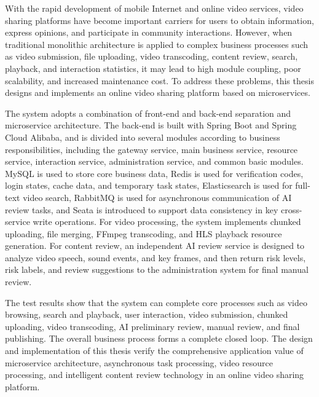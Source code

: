 \begin{abstractEn}
With the rapid development of mobile Internet and online video services, video sharing platforms have become important carriers for users to obtain information, express opinions, and participate in community interactions. However, when traditional monolithic architecture is applied to complex business processes such as video submission, file uploading, video transcoding, content review, search, playback, and interaction statistics, it may lead to high module coupling, poor scalability, and increased maintenance cost. To address these problems, this thesis designs and implements an online video sharing platform based on microservices.

The system adopts a combination of front-end and back-end separation and microservice architecture. The back-end is built with Spring Boot and Spring Cloud Alibaba, and is divided into several modules according to business responsibilities, including the gateway service, main business service, resource service, interaction service, administration service, and common basic modules. MySQL is used to store core business data, Redis is used for verification codes, login states, cache data, and temporary task states, Elasticsearch is used for full-text video search, RabbitMQ is used for asynchronous communication of AI review tasks, and Seata is introduced to support data consistency in key cross-service write operations. For video processing, the system implements chunked uploading, file merging, FFmpeg transcoding, and HLS playback resource generation. For content review, an independent AI review service is designed to analyze video speech, sound events, and key frames, and then return risk levels, risk labels, and review suggestions to the administration system for final manual review.

The test results show that the system can complete core processes such as video browsing, search and playback, user interaction, video submission, chunked uploading, video transcoding, AI preliminary review, manual review, and final publishing. The overall business process forms a complete closed loop. The design and implementation of this thesis verify the comprehensive application value of microservice architecture, asynchronous task processing, video resource processing, and intelligent content review technology in an online video sharing platform.

\end{abstractEn}